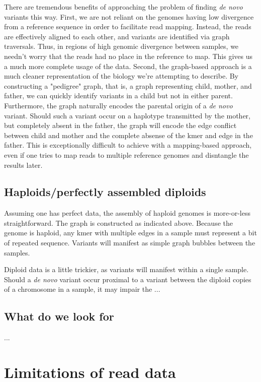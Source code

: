 There are tremendous benefits of approaching the problem of finding \textit{de novo} variants this way.  First, we are not reliant on the genomes having low divergence from a reference sequence in order to facilitate read mapping.  Instead, the reads are effectively aligned to each other, and variants are identified via graph traversals.  Thus, in regions of high genomic divergence between samples, we needn't worry that the reads had no place in the reference to map.  This gives us a much more complete usage of the data.  Second, the graph-based approach is a much cleaner representation of the biology we're attempting to describe.  By constructing a "pedigree" graph, that is, a graph representing child, mother, and father, we can quickly identify variants in a child but not in either parent.  Furthermore, the graph naturally encodes the parental origin of a \textit{de novo} variant.  Should such a variant occur on a haplotype transmitted by the mother, but completely absent in the father, the graph will encode the edge conflict between child and mother and the complete absense of the kmer and edge in the father.  This is exceptionally difficult to achieve with a mapping-based approach, even if one tries to map reads to multiple reference genomes and disntangle the results later.

\subsection{Haploids/perfectly assembled diploids}

Assuming one has perfect data, the assembly of haploid genomes is more-or-less straightforward.  The graph is constructed as indicated above.  Because the genome is haploid, any kmer with multiple edges in a sample must represent a bit of repeated sequence.  Variants will manifest as simple graph bubbles between the samples.

Diploid data is a little trickier, as variants will manifest within a single sample.  Should a \textit{de novo} variant occur proximal to a variant between the diploid copies of a chromosome in a sample, it may impair the ...

\subsection{What do we look for}

...

\section{Limitations of read data}

